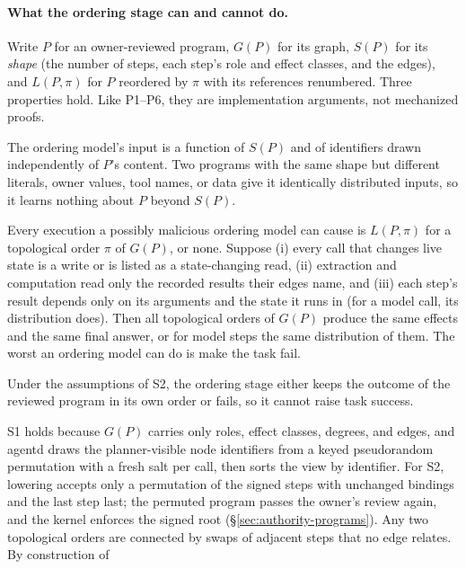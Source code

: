 \documentclass[letterpaper,twocolumn,10pt]{article}
\begin{document}
\paragraph{What the ordering stage can and cannot do.}
Write $P$ for an owner-reviewed program, $G(P)$ for its graph, $S(P)$ for
its \emph{shape} (the number of steps, each step's role and effect
classes, and the edges), and $L(P,\pi)$ for $P$ reordered by $\pi$ with its
references renumbered. Three properties hold. Like P1--P6, they are
implementation arguments, not mechanized proofs.
\begin{description}[style=nextline,font=\bfseries]
\item[S1 The view is the shape.] The ordering model's input is a function
  of $S(P)$ and of identifiers drawn independently of $P$'s content. Two
  programs with the same shape but different literals, owner values, tool
  names, or data give it identically distributed inputs, so it learns
  nothing about $P$ beyond $S(P)$.
\item[S2 It chooses only an order, and every order it may choose is
  equivalent.] Every execution a possibly malicious ordering model can
  cause is $L(P,\pi)$ for a topological order $\pi$ of $G(P)$, or none.
  Suppose (i) every call that changes live state is a write or is listed
  as a state-changing read, (ii) extraction and computation read only the
  recorded results their edges name, and (iii) each step's result depends
  only on its arguments and the state it runs in (for a model call, its
  distribution does). Then all topological orders of $G(P)$ produce the
  same effects and the same final answer, or for model steps the same
  distribution of them. The worst an ordering model can do is make the
  task fail.
\item[S3 No utility gain.] Under the assumptions of S2, the ordering stage
  either keeps the outcome of the reviewed program in its own order or
  fails, so it cannot raise task success.
\end{description}
S1 holds because $G(P)$ carries only roles, effect classes, degrees, and
edges, and agentd draws the planner-visible node identifiers from a keyed
pseudorandom permutation with a fresh salt per call, then sorts the view
by identifier.
For S2, lowering accepts only a permutation of the signed steps with
unchanged bindings and the last step last; the permuted program passes the
owner's review again, and the kernel enforces the signed root
(\S\ref{sec:authority-programs}). Any two topological orders are connected
by swaps of adjacent steps that no edge relates. By construction of
\end{document}
